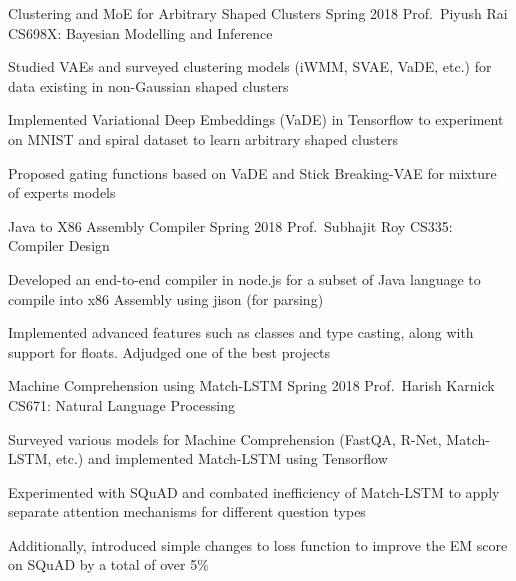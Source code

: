 \cventry
	{Clustering and MoE for Arbitrary Shaped Clusters}
	{Spring 2018}
	{Prof.\ Piyush Rai}
	{CS698X: Bayesian Modelling and Inference}
	{%
		\begin{cvitems}
            \item Studied VAEs and surveyed clustering models (iWMM, SVAE, VaDE, etc.) for data existing in non-Gaussian shaped clusters
            \item Implemented Variational Deep Embeddings (VaDE) in Tensorflow to experiment on MNIST and spiral dataset to learn arbitrary shaped clusters
            \item Proposed gating functions based on VaDE and Stick Breaking-VAE for mixture of experts models
		\end{cvitems}
	}

\cventry
	{Java to X86 Assembly Compiler}
	{Spring 2018}
	{Prof.\ Subhajit Roy}
	{CS335: Compiler Design}
	{%
		\begin{cvitems}
            \item Developed an end-to-end compiler in node.js for a subset of Java language to compile into x86 Assembly using jison (for parsing)
            \item Implemented advanced features such as classes and type casting, along with support for floats. Adjudged one of the best projects
		\end{cvitems}
	}

\cventry
	{Machine Comprehension using Match-LSTM}
	{Spring 2018}
	{Prof.\ Harish Karnick}
	{CS671: Natural Language Processing}
	{%
		\begin{cvitems}
            \item Surveyed various models for Machine Comprehension (FastQA, R-Net, Match-LSTM, etc.) and implemented Match-LSTM using Tensorflow
            \item Experimented with SQuAD and combated inefficiency of Match-LSTM to apply separate attention mechanisms for different question types
            \item Additionally, introduced simple changes to loss function to improve the EM score on SQuAD by a total of over 5\%
		\end{cvitems}
	}


